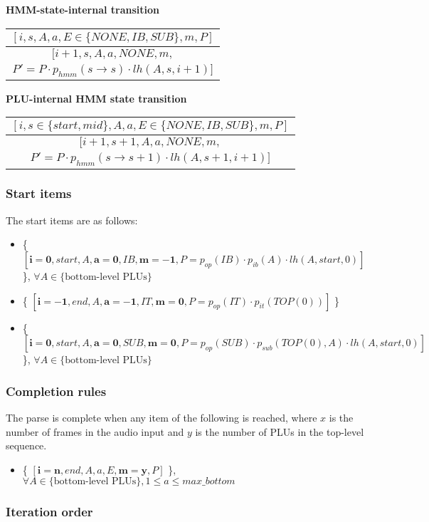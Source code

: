 \documentclass[11pt]{article}
\newcommand{\myrule}[2]{\begin{tabular}{c}
#1 \\
\hline
#2
\end{tabular}}
\newcommand{\toprulecomp}[7]{
    $[#1, #2, #3, #4, #5, #6, #7 ]$
}
\newcommand{\botrulecomp}[7]{
    $[#1, #2, #3, #4, #5, #6,$ \\
    $#7 ]$
}
\begin{document}
\textbf{HMM-state-internal transition}

\myrule{
	\toprulecomp{i}{s}{A}{a}{E\in\{NONE,IB,SUB\}}{m}{P}
	}
	{
	\botrulecomp{i+1}{s}{A}{a}{NONE}{m}{P'= P \cdot p_{hmm}(s \rightarrow s) \cdot lh(A,s,i+1)}
	}
	
\textbf{PLU-internal HMM state transition}

\myrule{
	\toprulecomp{i}{s\in\{start,mid\}}{A}{a}{E\in\{NONE,IB,SUB\}}{m}{P}
	}
	{
	\botrulecomp{i+1}{s+1}{A}{a}{NONE}{m}{P'= P \cdot p_{hmm}(s \rightarrow s+1) \cdot lh(A,s+1,i+1)}
	}
	
\subsubsection{Start items}

The start items are as follows:	

\begin{itemize}
\item \{\toprulecomp{\mathbf{i=0}}{start}{A}{\mathbf{a=0}}{IB}{\mathbf{m=-1}}{P= p_{op}(IB) \cdot p_{ib}(A) \cdot lh(A,start,0)}\},
$\forall A\in \{\text{bottom-level PLUs}\}$

\item \{\toprulecomp{\mathbf{i=-1}}{end}{A}{\mathbf{a=-1}}{IT}{\mathbf{m=0}}{P= p_{op}(IT) \cdot p_{it}(TOP(0))}\}

\item \{\toprulecomp{\mathbf{i=0}}{start}{A}{\mathbf{a=0}}{SUB}{\mathbf{m=0}}{P= p_{op}(SUB) \cdot p_{sub}(TOP(0),A) \cdot lh(A,start,0)}\}, \newline
$\forall A\in \{\text{bottom-level PLUs}\}$
\end{itemize}
	
\subsubsection{Completion rules}

The parse is complete when any item of the following is reached, where $x$ is the number of frames in the audio input and $y$ is the number of PLUs in the top-level sequence.

\begin{itemize}
\item \{\toprulecomp{\mathbf{i=n}}{end}{A}{a}{E}{\mathbf{m=y}}{P}\}, $\forall A\in \{\text{bottom-level PLUs}\}, 1\leq a\leq max\_bottom$
\end{itemize}

\subsubsection{Iteration order}
\end{document}
